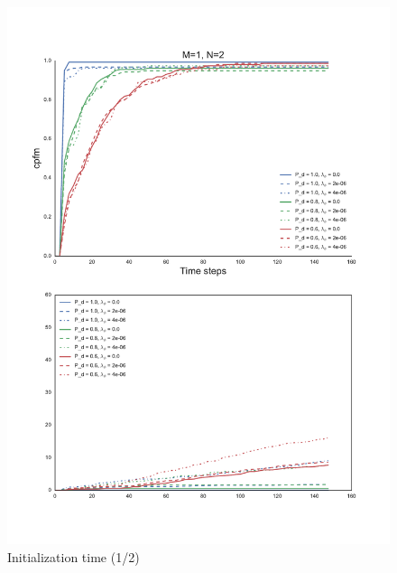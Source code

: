 \begin{figure}
\centering
\includegraphics[height = .9\textheight]{Figures/plots/Scenario1_Init-Time(1-2).pdf}
\caption{Initialization time (1/2)}\label{fig:init_time_1-2}
\end{figure}

